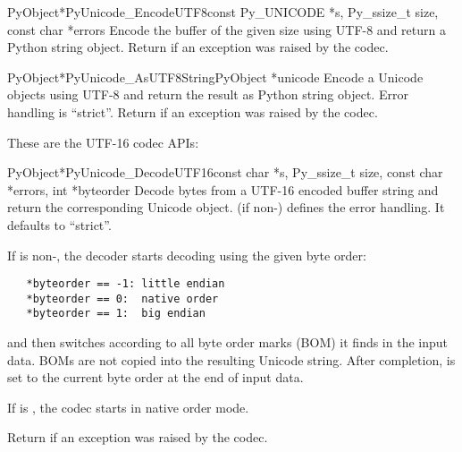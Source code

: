 \begin{cfuncdesc}{PyObject*}{PyUnicode_EncodeUTF8}{const Py_UNICODE *s,
                                               Py_ssize_t size,
                                               const char *errors}
  Encode the  buffer of the given size using UTF-8
  and return a Python string object.  Return \NULL{} if an exception
  was raised by the codec.
\end{cfuncdesc}

\begin{cfuncdesc}{PyObject*}{PyUnicode_AsUTF8String}{PyObject *unicode}
  Encode a Unicode objects using UTF-8 and return the result as
  Python string object.  Error handling is ``strict''.  Return
  \NULL{} if an exception was raised by the codec.
\end{cfuncdesc}


These are the UTF-16 codec APIs:

\begin{cfuncdesc}{PyObject*}{PyUnicode_DecodeUTF16}{const char *s,
                                               Py_ssize_t size,
                                               const char *errors,
                                               int *byteorder}
  Decode  bytes from a UTF-16 encoded buffer string and
  return the corresponding Unicode object.   (if
  non-\NULL{}) defines the error handling. It defaults to ``strict''.

  If  is non-\NULL{}, the decoder starts decoding using
  the given byte order:

\begin{verbatim}
   *byteorder == -1: little endian
   *byteorder == 0:  native order
   *byteorder == 1:  big endian
\end{verbatim}

  and then switches according to all byte order marks (BOM) it finds
  in the input data.  BOMs are not copied into the resulting Unicode
  string.  After completion,  is set to the current
  byte order at the end of input data.

  If  is \NULL{}, the codec starts in native order mode.

  Return \NULL{} if an exception was raised by the codec.
\end{cfuncdesc}

